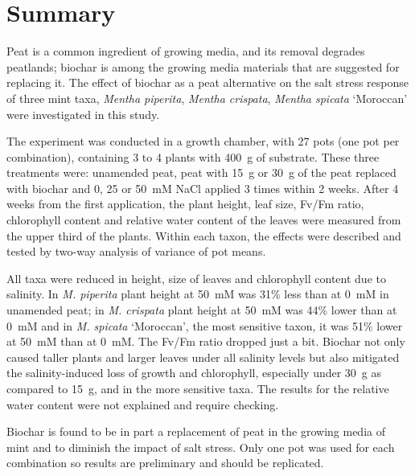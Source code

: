 \chapter{Summary}

Peat is a common ingredient of growing media, and its removal degrades peatlands; biochar is among the growing media materials that are suggested for replacing it. The effect of biochar as a peat alternative on the salt stress response of three mint taxa, \textit{Mentha piperita}, \textit{Mentha crispata}, \textit{Mentha spicata} `Moroccan' were investigated in this study.

The experiment was conducted in a growth chamber, with 27 pots (one pot per combination), containing 3 to 4 plants with 400~g of substrate. These three treatments were: unamended peat, peat with 15~g or 30~g of the peat replaced with biochar and 0, 25 or 50~mM NaCl applied 3 times within 2 weeks. After 4 weeks from the first application, the plant height, leaf size, Fv/Fm ratio, chlorophyll content and relative water content of the leaves were measured from the upper third of the plants. Within each taxon, the effects were described and tested by two-way analysis of variance of pot means.

All taxa were reduced in height, size of leaves and chlorophyll content due to salinity. In \textit{M. piperita} plant height at 50~mM was 31\% less than at 0~mM in unamended peat; in \textit{M. crispata} plant height at 50~mM was 44\% lower than at 0~mM and in \textit{M. spicata} `Moroccan', the most sensitive taxon, it was 51\% lower at 50~mM than at 0~mM. The Fv/Fm ratio dropped just a bit. Biochar not only caused taller plants and larger leaves under all salinity levels but also mitigated the salinity-induced loss of growth and chlorophyll, especially under 30~g as compared to 15~g, and in the more sensitive taxa. The results for the relative water content were not explained and require checking.

Biochar is found to be in part a replacement of peat in the growing media of mint and to diminish the impact of salt stress. Only one pot was used for each combination so results are preliminary and should be replicated.
